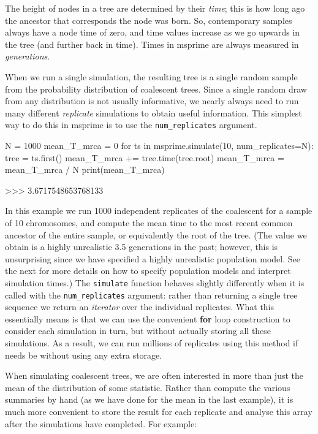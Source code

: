 \documentclass[graybox]{svmult}
\begin{document}
The height of nodes in a tree are determined by their \emph{time}; this
is how long ago the ancestor that corresponds the node was born. So,
contemporary samples always have a node time of zero, and time values
increase as we go upwards in the tree (and further back in time). Times
in msprime are always measured in \emph{generations}.

When we run a single simulation, the resulting tree is a single random
sample from the probability distribution of coalescent trees. Since a
single random draw from any distribution is not usually informative, we
nearly always need to run many different \emph{replicate} simulations to
obtain useful information. This simplest way to do this in msprime is to
use the \texttt{num\_replicates} argument.

\begin{pythoncode}
N = 1000
mean_T_mrca = 0
for ts in msprime.simulate(10, num_replicates=N):
    tree = ts.first()
    mean_T_mrca += tree.time(tree.root)
mean_T_mrca = mean_T_mrca / N
print(mean_T_mrca)

>>> 3.6717548653768133
\end{pythoncode}

    In this example we run 1000 independent replicates of the coalescent for
a sample of 10 chromosomes, and compute the mean time to the most recent
common ancestor of the entire sample, or equivalently the root of the
tree. (The value we obtain is a highly unrealistic 3.5 generations in
the past; however, this is unsurprising since we have specified a highly
unrealistic population model. See the next for more details on how to
specify population models and interpret simulation times.) The
\texttt{simulate} function behaves slightly differently when it is
called with the \texttt{num\_replicates} argument: rather than returning
a single tree sequence we return an \emph{iterator} over the individual
replicates. What this essentially means is that we can use the
convenient \textbf{for} loop construction to consider each simulation in
turn, but without actually storing all these simulations. As a result,
we can run millions of replicates using this method if needs be without
using any extra storage.

When simulating coalescent trees, we are often interested in more than
just the mean of the distribution of some statistic. Rather than compute
the various summaries by hand (as we have done for the mean in the last
example), it is much more convenient to store the result for each
replicate and analyse this array after the simulations have completed.
For example:
\end{document}
